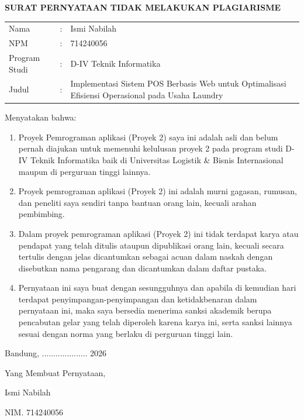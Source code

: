 
\begin{center}
    {\fontsize{14}{16}\selectfont\bfseries SURAT PERNYATAAN TIDAK MELAKUKAN PLAGIARISME}
\end{center}

\vspace{1cm}

\begin{tabular}{l c p{10cm}}
    Nama & : & Ismi Nabilah \\
    NPM & : & 714240056 \\
    Program Studi & : & D-IV Teknik Informatika \\
    Judul & : & Implementasi Sistem POS Berbasis Web untuk Optimalisasi Efisiensi Operasional pada Usaha Laundry \\
\end{tabular}

\vspace{0.5cm}

\noindent
Menyatakan bahwa:

\begin{enumerate}[leftmargin=1cm]
    \item Proyek Pemrograman aplikasi (Proyek 2) saya ini adalah asli dan belum pernah diajukan untuk memenuhi kelulusan proyek 2 pada program studi D-IV Teknik Informatika baik di Universitas Logistik & Bisnis Internasional maupun di perguruan tinggi lainnya.
    \item Proyek pemrograman aplikasi (Proyek 2) ini adalah murni gagasan, rumusan, dan peneliti saya sendiri tanpa bantuan orang lain, kecuali arahan pembimbing.
    \item Dalam proyek pemrograman aplikasi (Proyek 2) ini tidak terdapat karya atau pendapat yang telah ditulis ataupun dipublikasi orang lain, kecuali secara tertulis dengan jelas dicantumkan sebagai acuan dalam naskah dengan disebutkan nama pengarang dan dicantumkan dalam daftar pustaka.
    \item Pernyataan ini saya buat dengan sesungguhnya dan apabila di kemudian hari terdapat penyimpangan-penyimpangan dan ketidakbenaran dalam pernyataan ini, maka saya bersedia menerima sanksi akademik berupa pencabutan gelar yang telah diperoleh karena karya ini, serta sanksi lainnya sesuai dengan norma yang berlaku di perguruan tinggi lain.
\end{enumerate}

\vspace{1cm}

\noindent
\hfill Bandung, .................... 2026


\noindent
\hfill Yang Membuat Pernyataan,

\vspace{2cm}

\noindent
\hfill Ismi Nabilah

\noindent
\hfill NIM. 714240056
